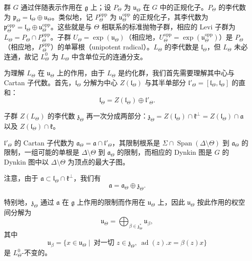 群 $G$ 通过伴随表示作用在 $\mathfrak{g}$ 上；设 $P_\Theta$ 为 $\mathfrak{u}_\Theta$ 在 $G$ 中的正规化子。$P_\Theta$ 的李代数为 $\mathfrak{p}_\Theta=\mathfrak{l}_\Theta\oplus\mathfrak{u}_\Theta$。类似地，记 $P_\Theta^{\mathrm{opp}}$ 为 $\mathfrak{u}_\Theta^{\mathrm{opp}}$ 的正规化子，其李代数为 $\mathfrak{p}_\Theta^{\mathrm{opp}}=\mathfrak{l}_\Theta\oplus\mathfrak{u}_\Theta^{\mathrm{opp}}$。这些就是与 $\Theta$ 相联系的标准抛物子群，相应的 Levi 子群为 $L_\Theta=P_\Theta\cap P_\Theta^{\mathrm{opp}}$。子群 $U_\Theta=\exp(\mathfrak{u}_\Theta)$（相应地，$U_\Theta^{\mathrm{opp}}=\exp(\mathfrak{u}_\Theta^{\mathrm{opp}})$）是 $P_\Theta$（相应地，$P_\Theta^{\mathrm{opp}}$）的单幂根（unipotent radical）。$L_\Theta$ 的李代数是 $\mathfrak{l}_\Theta$，但 $L_\Theta$ 未必连通，故记 $L_\Theta^0$ 为 $L_\Theta$ 中含单位元的连通分支。

为理解 $L_\Theta$ 在 $\mathfrak{u}_\Theta$ 上的作用，由于 $L_\Theta$ 是约化群，我们首先需要理解其中心与 Cartan 子代数。首先，$\mathfrak{l}_\Theta$ 分解为中心 $Z(\mathfrak{l}_\Theta)$ 与其半单部分 $\mathfrak{l}'_\Theta=[\mathfrak{l}_\Theta,\mathfrak{l}_\Theta]$ 的直和：
\[
\mathfrak{l}_\Theta=Z(\mathfrak{l}_\Theta)\oplus\mathfrak{l}'_\Theta.
\]

子群 $Z(L_\Theta)$ 的李代数 $\mathfrak{z}_\Theta$ 再一次分成两部分：$\mathfrak{z}_\Theta=Z(\mathfrak{l}_\Theta)\cap\mathfrak{k}^\perp=Z(\mathfrak{l}_\Theta)\cap\mathfrak{a}$ 以及 $Z(\mathfrak{l}_\Theta)\cap\mathfrak{k}$。

$\mathfrak{l}'_\Theta$ 的 Cartan 子代数为 $\mathfrak{a}_\Theta=\mathfrak{a}\cap\mathfrak{l}'_\Theta$，其限制根系是 $\Sigma\cap\operatorname{Span}(\Delta\setminus\Theta)$ 到 $\mathfrak{a}_\Theta$ 的限制，一组可能的单根是 $\Delta\setminus\Theta$ 到 $\mathfrak{a}_\Theta$ 的限制，而相应的 Dynkin 图是 $G$ 的 Dynkin 图中以 $\Delta\setminus\Theta$ 为顶点的最大子图。

注意，由于 $\mathfrak{a}\subset\mathfrak{l}_\Theta\cap\mathfrak{k}^\perp$，我们有
\[
\mathfrak{a}=\mathfrak{a}_\Theta\oplus\mathfrak{z}_\Theta.
\]

特别地，$\mathfrak{z}_\Theta$ 通过 $\mathfrak{a}$ 在 $\mathfrak{g}$ 上作用的限制而作用在 $\mathfrak{u}_\Theta$ 上，因此 $\mathfrak{u}_\Theta$ 按此作用的权空间分解为
\begin{equation}
\mathfrak{u}_\Theta=\bigoplus_{\beta\in\mathfrak{z}_\Theta^*}\mathfrak{u}_\beta,
\tag{12.2}
\end{equation}
其中
\begin{equation}
\mathfrak{u}_\beta=\bigl\{x\in\mathfrak{u}_\Theta\mid\ \text{对一切 } z\in\mathfrak{z}_\Theta,\ \operatorname{ad}(z).x=\beta(z)x\bigr\}
\tag{12.3}
\end{equation}
是 $L_\Theta^0$-不变的。

